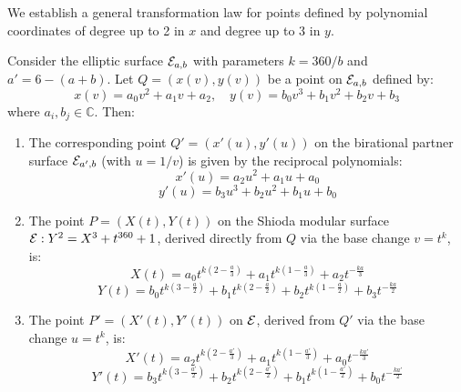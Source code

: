 \documentclass[11pt]{amsart}
\begin{document}
We establish a general transformation law for points defined by polynomial coordinates of degree up to 2 in $x$ and degree up to 3 in $y$.

\begin{lema}
	\label{lem:general_transform}
	Consider the elliptic surface ${\mathcal E}_{a,b}$ with parameters $k = 360/b$ and $a' = 6-(a+b)$. Let $Q = (x(v), y(v))$ be a point on ${\mathcal E}_{a,b}$ defined by:
	\[ x(v) = a_0 v^2 + a_1 v + a_2, \quad y(v) = b_0 v^3 + b_1 v^2 + b_2 v + b_3 \]
	where $a_i, b_j \in \mathbb{C}$. Then:
	
	\begin{enumerate}
		\item [(i)] The corresponding point $Q'=(x'(u), y'(u))$ on the birational partner surface ${\mathcal E}_{a', b}$ (with $u=1/v$) is given by the reciprocal polynomials:
		\[ x'(u) = a_2 u^2 + a_1 u + a_0 \]
		\[ y'(u) = b_3 u^3 + b_2 u^2 + b_1 u + b_0 \]
		
		\item  [(ii)] The point $P=(X(t), Y(t))$ on the Shioda modular surface ${\mathcal E}: Y^2 = X^3 + t^{360} + 1$, derived directly from $Q$ via the base change $v=t^k$, is:
		\[ X(t) = a_0 t^{k(2 - \frac{a}{3})} + a_1 t^{k(1 - \frac{a}{3})} + a_2 t^{-\frac{ka}{3}} \]
		\[ Y(t) = b_0 t^{k(3 - \frac{a}{2})} + b_1 t^{k(2 - \frac{a}{2})} + b_2 t^{k(1 - \frac{a}{2})} + b_3 t^{-\frac{ka}{2}} \]
		
		\item  [(iii)] The point $P'=(X'(t), Y'(t))$ on ${\mathcal E}$, derived from $Q'$ via the base change $u=t^k$, is:
		\[ X'(t) = a_2 t^{k(2 - \frac{a'}{3})} + a_1 t^{k(1 - \frac{a'}{3})} + a_0 t^{-\frac{ka'}{3}} \]
		\[ Y'(t) = b_3 t^{k(3 - \frac{a'}{2})} + b_2 t^{k(2 - \frac{a'}{2})} + b_1 t^{k(1 - \frac{a'}{2})} + b_0 t^{-\frac{ka'}{2}} \]
	\end{enumerate}
\end{lema}
\end{document}
